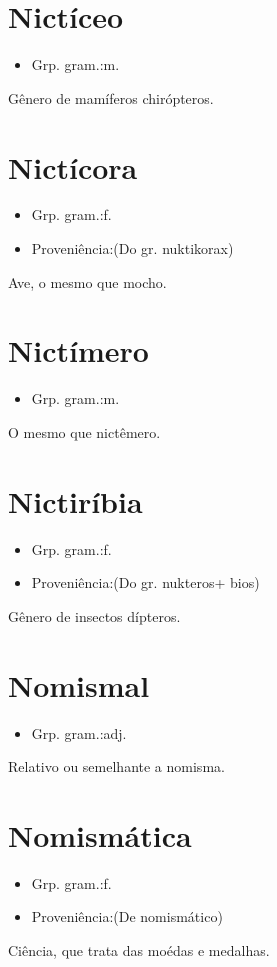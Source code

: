\section{Nictíceo}
\begin{itemize}
\item {Grp. gram.:m.}
\end{itemize}
Gênero de mamíferos chirópteros.
\section{Nictícora}
\begin{itemize}
\item {Grp. gram.:f.}
\end{itemize}
\begin{itemize}
\item {Proveniência:(Do gr. \textunderscore nuktikorax\textunderscore )}
\end{itemize}
Ave, o mesmo que \textunderscore mocho\textunderscore .
\section{Nictímero}
\begin{itemize}
\item {Grp. gram.:m.}
\end{itemize}
O mesmo que \textunderscore nictêmero\textunderscore .
\section{Nictiríbia}
\begin{itemize}
\item {Grp. gram.:f.}
\end{itemize}
\begin{itemize}
\item {Proveniência:(Do gr. \textunderscore nukteros\textunderscore  + \textunderscore bios\textunderscore )}
\end{itemize}
Gênero de insectos dípteros.
\section{Nomismal}
\begin{itemize}
\item {Grp. gram.:adj.}
\end{itemize}
Relativo ou semelhante a nomisma.
\section{Nomismática}
\begin{itemize}
\item {Grp. gram.:f.}
\end{itemize}
\begin{itemize}
\item {Proveniência:(De \textunderscore nomismático\textunderscore )}
\end{itemize}
Ciência, que trata das moédas e medalhas.
